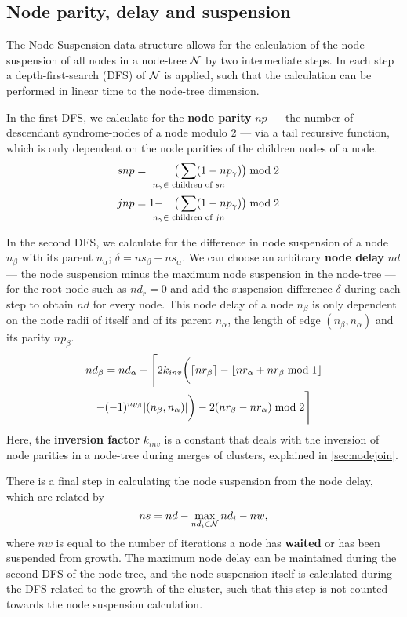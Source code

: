 \subsection{Node parity, delay and suspension}\label{sec:paritydelaysus}

The Node-Suspension data structure allows for the calculation of the node suspension of all nodes in a node-tree $\mathcal{N}$ by two intermediate steps. In each step a depth-first-search (DFS) of $\mathcal{N}$ is applied, such that the calculation can be performed in linear time to the node-tree dimension.

In the first DFS, we calculate for the \textbf{node parity} $np$ --- the number of descendant syndrome-nodes of a node modulo 2 --- via a tail recursive function, which is only dependent on the node parities of the children nodes of a node.
\begin{align}\label{eq:nodeparity}
    snp &= &\big( \sum_{\mathclap{n_\gamma \in \text{ children of } sn}} (1-np_\gamma) \big ) \bmod 2 \hspace{1em}  \\
    jnp &= 1 - &\big(\sum_{\mathclap{n_\gamma \in \text{ children of } jn}} (1-np_\gamma) \big) \bmod 2 \hspace{1em}
\end{align}

In the second DFS, we calculate for the difference in node suspension of a node $n_\beta$ with its parent $n_\alpha$; $\delta = ns_\beta - ns_\alpha$. We can choose an arbitrary \textbf{node delay} $nd$ --- the node suspension minus the maximum node suspension in the node-tree --- for the root node such as $nd_r=0$ and add the suspension difference $\delta$ during each step to obtain $nd$ for every node. This node delay of a node $n_\beta$ is only dependent on the node radii of itself and of its parent $n_\alpha$, the length of edge $(n_\beta, n_\alpha)$ and its parity $np_\beta$. 
\begin{multline}\label{eq:delayequation}
    nd_\beta = nd_\alpha + \Bigg \lceil 2k_{inv}\bigg(\ceil{nr_\beta} - \floor{nr_\alpha + nr_\beta \bmod 1}\\
    - (-1)^{np_\beta}\abs{(n_\beta,n_\alpha)}\bigg) - 2(nr_\beta - nr_\alpha) \bmod2 \Bigg \rceil
\end{multline}
Here, the \textbf{inversion factor} $k_{inv}$ is a constant that deals with the inversion of node parities in a node-tree during merges of clusters, explained in \ref{sec:nodejoin}. 

There is a final step in calculating the node suspension from the node delay, which are related by
\begin{equation}\label{eq:suspension}
    ns = nd - \max_{nd_i \in \nset} nd_i - nw, 
\end{equation}
where $nw$ is equal to the number of iterations a node has \textbf{waited} or has been suspended from growth. The maximum node delay can be maintained during the second DFS of the node-tree, and the node suspension itself is calculated during the DFS related to the growth of the cluster, such that this step is not counted towards the node suspension calculation. 

